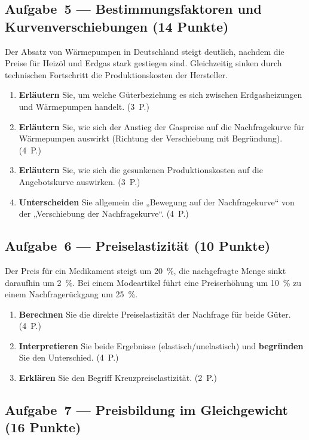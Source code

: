 \documentclass[11pt, a4paper]{article}
\begin{document}
\subsection*{Aufgabe~5 --- Bestimmungsfaktoren und Kurvenverschiebungen (14 Punkte)}

Der Absatz von Wärmepumpen in Deutschland steigt deutlich, nachdem die Preise für Heizöl
und Erdgas stark gestiegen sind. Gleichzeitig sinken durch technischen Fortschritt die
Produktionskosten der Hersteller.

\begin{enumerate}[label=(\alph*)]
  \item \textbf{Erläutern} Sie, um welche Güterbeziehung es sich zwischen Erdgasheizungen und Wärmepumpen handelt. \hfill (3~P.)
  \item \textbf{Erläutern} Sie, wie sich der Anstieg der Gaspreise auf die Nachfragekurve für Wärmepumpen auswirkt (Richtung der Verschiebung mit Begründung). \hfill (4~P.)
  \item \textbf{Erläutern} Sie, wie sich die gesunkenen Produktionskosten auf die Angebotskurve auswirken. \hfill (3~P.)
  \item \textbf{Unterscheiden} Sie allgemein die „Bewegung auf der Nachfragekurve`` von der „Verschiebung der Nachfragekurve``. \hfill (4~P.)
\end{enumerate}

\subsection*{Aufgabe~6 --- Preiselastizität (10 Punkte)}

Der Preis für ein Medikament steigt um 20~\%, die nachgefragte Menge sinkt daraufhin um
2~\%. Bei einem Modeartikel führt eine Preiserhöhung um 10~\% zu einem Nachfragerückgang
um 25~\%.

\begin{enumerate}[label=(\alph*)]
  \item \textbf{Berechnen} Sie die direkte Preiselastizität der Nachfrage für beide Güter. \hfill (4~P.)
  \item \textbf{Interpretieren} Sie beide Ergebnisse (elastisch/unelastisch) und \textbf{begründen} Sie den Unterschied. \hfill (4~P.)
  \item \textbf{Erklären} Sie den Begriff Kreuzpreiselastizität. \hfill (2~P.)
\end{enumerate}

\subsection*{Aufgabe~7 --- Preisbildung im Gleichgewicht (16 Punkte)}
\end{document}
